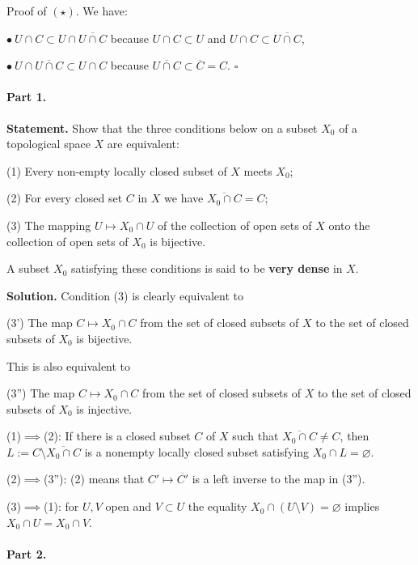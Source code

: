 \documentclass[12pt,letterpaper]{article}%
\newcommand{\nn}{\noindent}
\begin{document}
\nn Proof of $(\star)$. We have:

\nn$\bullet\ U\cap C\subset U\cap\overline{U\cap C}$ because $U\cap C\subset U$ and $U\cap C\subset\overline{U\cap C}$,

\nn$\bullet\ U\cap\overline{U\cap C}\subset U\cap C$ because $\overline{U\cap C}\subset\overline C=C$. $\square$ 

\paragraph{Part 1.}

\nn\textbf{Statement.} Show that the three conditions below on a subset $X_0$ of a topological space $X$ are equivalent:

\nn(1) Every non-empty locally closed subset of $X$ meets $X_0$;

\nn(2) For every closed set $C$ in $X$ we have $\overline{X_0\cap C}=C$;

\nn(3) The mapping $U\mapsto X_0\cap U$ of the collection of open sets of $X$ onto the collection of open sets of $X_0$ is bijective.

A subset $X_0$ satisfying these conditions is said to be \textbf{very dense} in $X$. 

\nn\textbf{Solution.} Condition (3) is clearly equivalent to 

\nn(3') The map $C\mapsto X_0\cap C$ from the set of closed subsets of $X$ to the set of closed subsets of $X_0$ is bijective.

This is also equivalent to 

\nn(3'') The map $C\mapsto X_0\cap C$ from the set of closed subsets of $X$ to the set of closed subsets of $X_0$ is injective.

\nn(1)$\implies$(2): If there is a closed subset $C$ of $X$ such that $\overline{X_0\cap C}\ne C$, then $L:=C\setminus\overline{X_0\cap C}$ is  a nonempty locally closed subset satisfying $X_0\cap L=\varnothing$. 

\nn(2)$\implies$(3''): (2) means that $C'\mapsto\overline{C'}$ is a left inverse to the map in (3''). 

\nn(3)$\implies$(1): for $U,V$ open and $V\subset U$ the equality $X_0\cap(U\setminus V)=\varnothing$ implies $X_0\cap U=X_0\cap V$. 

\paragraph{Part 2.}
\end{document}
